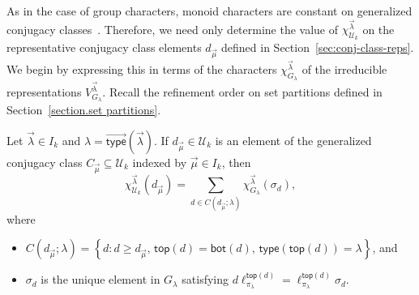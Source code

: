 \documentclass[ALCO,Unicode]{cedram}
\newcommand{\vtype}{\overrightarrow{\mathsf{type}}}
\begin{document}
As in the case of group characters, monoid characters are constant on
generalized conjugacy classes~\cite[Proposition~7.9]{Steinberg.2016}.
Therefore, we need only determine the value of
$\chi^{\vec{\lambda}}_{\mathcal{U}_k}$
on the representative conjugacy class elements
$d_{\vec{\mu}}$ defined in Section~\ref{sec:conj-class-reps}.
We begin by expressing this in terms of the characters
$\chi^{\vec{\lambda}}_{G_\lambda}$
of the irreducible representations $V^{\vec{\lambda}}_{G_\lambda}$.
Recall the refinement order on set partitions defined in Section~\ref{section.set partitions}.

\begin{prop}
\label{prop:char}
Let $\vec{\lambda} \in I_k$ and $\lambda = \vtype(\vec{\lambda})$.
If $d_{\vec{\mu}} \in \mathcal{U}_k$ is an element of the generalized conjugacy
class $C_{\vec{\mu}} \subseteq \mathcal{U}_k$ indexed by $\vec{\mu} \in I_k$, then
\[
    \chi^{\vec{\lambda}}_{\mathcal{U}_k}(d_{\vec{\mu}})
    = \sum_{d \in C(d_{\vec{\mu}}; \lambda)} \chi^{\vec{\lambda}}_{G_\lambda}(\sigma_d),
\]
where
\begin{itemize}
    \item
        $C(d_{\vec{\mu}}; \lambda)
        = \left\{
        d : d \geqslant d_{\vec{\mu}}, \,
        \mathsf{top}(d) = \mathsf{bot}(d), \, \mathsf{type}(\mathsf{top}(d))=\lambda
        \right\}$, and
    \item
        $\sigma_d$ is the unique element in $G_\lambda$ satisfying
        $d \ell_{\pi_\lambda}^{\mathsf{top}(d)} = \ell_{\pi_\lambda}^{\mathsf{top}(d)} \sigma_d$.
\end{itemize}
\end{prop}
\end{document}
